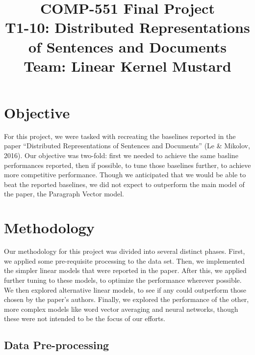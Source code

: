 \documentclass[conference]{IEEEtran}
\begin{document}
\title{COMP-551 Final Project\\
{\LARGE T1-10: Distributed Representations of Sentences and Documents}\\
{\Large Team: Linear Kernel Mustard}
}

\author{
\and
{}
\and
{}
}

\maketitle

\section{Objective}

For this project, we were tasked with recreating the baselines reported in the paper ``Distributed Representations of Sentences and Documents'' (Le \& Mikolov, 2016). Our objective was two-fold: first we needed to achieve the same basline performances reported, then if possible, to tune those baselines further, to achieve more competitive performance. Though we anticipated that we would be able to beat the reported baselines, we did not expect to outperform the main model of the paper, the Paragraph Vector model.


\section{Methodology}

Our methodology for this project was divided into several distinct phases. First, we applied some pre-requisite processing to the data set. Then, we implemented the simpler linear models that were reported in the paper. After this, we applied further tuning to these models, to optimize the performance wherever possible. We then explored alternative linear models, to see if any could outperform those chosen by the paper's authors. Finally, we explored the performance of the other, more complex models like word vector averaging and neural networks, though these were not intended to be the focus of our efforts.

\subsection{Data Pre-processing}
\end{document}
